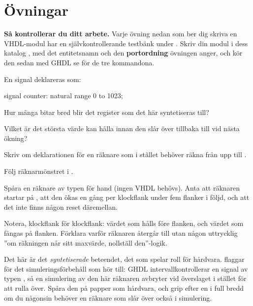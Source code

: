 
\section{Övningar}
\label{c6:sec:exercises}

\begin{aside}
\textbf{Så kontrollerar du ditt arbete.} Varje övning nedan som ber dig skriva en VHDL-modul har en
självkontrollerande testbänk under . Skriv din modul i dess katalog
, med det entitetsnamn och den \textbf{portordning} övningen anger, och
kör den sedan med GHDL \textemdash{} se  för de tre kommandona.
\end{aside}


\label{c6:ex:width}
En signal deklareras som:

\begin{vhdlcode}
signal counter: natural range 0 to 1023;
\end{vhdlcode}

 Hur många bitar bred blir det register som det här syntetiseras till?

 Vilket är det största värde  kan hålla innan den slår över tillbaka till
 vid nästa ökning?

 Skriv om deklarationen för en räknare som i stället behöver räkna från  upp till
.

Följ räknarmönstret i .

\label{c6:ex:trace}
Spåra en räknare av typen  för hand (ingen VHDL behövs). Anta att
räknaren startar på , att den ökas en gång per klockflank under fem flanker i följd, och
att det inte finns någon reset däremellan.

Notera, klockflank för klockflank: värdet som hålls före flanken, och värdet som fångas på flanken.
Förklara varför räknaren återgår till  utan någon uttrycklig ”om räkningen når sitt
maxvärde, nollställ den”-logik.

\note[Observera]Det här är det \emph{syntetiserade} beteendet, det som spelar roll för hårdvara.
 flaggar för det simuleringsförbehåll som hör till: GHDL
intervallkontrollerar en signal av typen , så en simulering av den här
räknaren avbryter vid överslaget i stället för att rulla över. Spåra den på papper som hårdvara,
och grip efter en  i full bredd om du någonsin behöver en räknare som slår över också
i simulering.

